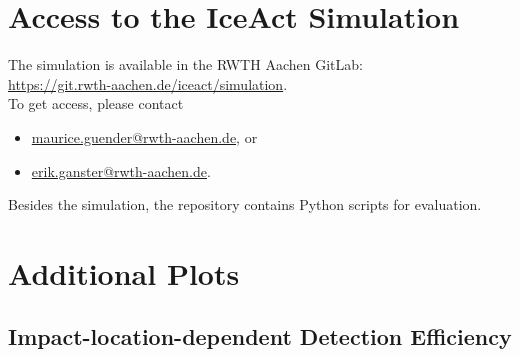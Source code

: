 \chapter{Access to the IceAct \geant Simulation}

The \iceact \geant simulation is available in the RWTH Aachen GitLab:\\

\url{https://git.rwth-aachen.de/iceact/simulation}.\\
 
To get access, please contact
\begin{itemize}
	\item \href{mailto:maurice.guender@rwth-aachen.de}{maurice.guender@rwth-aachen.de}, or
	\item \href{mailto:erik.ganster@rwth-aachen.de}{erik.ganster@rwth-aachen.de}. 
\end{itemize}

Besides the \geant simulation, the repository contains Python scripts for evaluation.

\chapter{Additional Plots}

\section{Impact-location-dependent Detection Efficiency}\label{appendix:alienplots}

\begin{figure}[H]
	\centering
	\begin{subfigure}[t]{0.492\textwidth}
		\subcaption{}
	\end{subfigure}
	\hfill
	\begin{subfigure}[t]{0.492\textwidth}
		\subcaption{}
	\end{subfigure}
	\hfill
\end{figure}

\begin{figure}[H]
	\ContinuedFloat
	\centering
	\begin{subfigure}[t]{0.492\textwidth}
		\subcaption{}
	\end{subfigure}
	\hfill
	\begin{subfigure}[t]{0.492\textwidth}
		\subcaption{}
	\end{subfigure}
	\hfill
	\begin{subfigure}[t]{0.492\textwidth}
		\subcaption{}
	\end{subfigure}	
	\hfill
	\begin{subfigure}[t]{0.492\textwidth}
		\subcaption{}
	\end{subfigure}
\end{figure}

